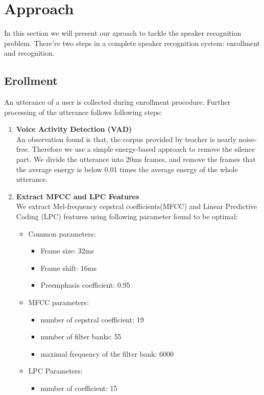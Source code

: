 \section{Approach}
	In this section we will present our aproach to tackle the speaker recognition problem.
	There're two steps in a complete speaker recognition system: enrollment and recognition.
\subsection{Erollment}
	\label{sec:approach_enrollment}
	An utterance of a user is collected during enrollment procedure.
	Further processing of the utterance follows following steps:
	\begin{enumerate}
		\item \textbf{Voice Activity Detection (VAD)} \\
			An observation found is that, the corpus provided by teacher is
			nearly noise-free. Therefore we use a simple energy-based approach
			to remove the silence part. We divide the utterance into 20ms frames,
			and remove the frames that the average energy is below 0.01 times
			the average energy of the whole utterance.

		\item \textbf{Extract MFCC and LPC Features} \\ We extract
			Mel-frequency cepstral coefficients(MFCC) and Linear Predictive
			Coding (LPC) features using following parameter found to be
			optimal:

			\begin{itemize}
				\item Common parameters:
					\begin{itemize}
						\item Frame size: 32ms
						\item Frame shift: 16ms
						\item Preemphasis coefficient: 0.95
					\end{itemize}
				\item MFCC parameters:
					\begin{itemize}
						\item number of cepstral coefficient: 19
						\item number of filter banks: 55
						\item maximal frequency of the filter bank: 6000
					\end{itemize}
				\item LPC Parameters:
					\begin{itemize}
						\item number of coefficient: 15
					\end{itemize}
			\end{itemize}


\end{enumerate}
